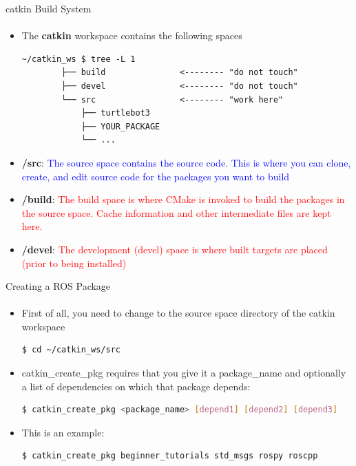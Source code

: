 \documentclass[aspectratio=169]{beamer}
\begin{document}
\begin{frame}[fragile]{catkin Build System}
	\framesubtitle{ }
    \begin{itemize}
        \item The \textbf{catkin} workspace contains the following spaces

		\begin{lstlisting}[style=ascii-tree]
		~/catkin_ws $ tree -L 1
		├── build				<-------- "do not touch"
		├── devel				<-------- "do not touch"
		└── src					<-------- "work here"
			├── turtlebot3
			├── YOUR_PACKAGE
			└── ...
		\end{lstlisting}

		\item \textbf{/src}: \textcolor{blue}{The source space contains the source code. This is where you can clone, create, and edit source code for the packages you want to build}
		\item \textbf{/build}: \textcolor{red}{The build space is where CMake is invoked to build the packages in the source space. Cache information and other intermediate files are kept here.}
		\item \textbf{/devel}: \textcolor{red}{The development (devel) space is where built targets are placed (prior to being installed)}
		\end{itemize}
\end{frame}


\begin{frame}[fragile]{Creating a ROS Package}
	\framesubtitle{ }
    \begin{itemize}
        \item First of all, you need to change to the source space directory of the catkin workspace
		\begin{lstlisting}[language=bash]
	$ cd ~/catkin_ws/src
		\end{lstlisting}
		\item catkin\_create\_pkg requires that you give it a package\_name and optionally a list of dependencies on which that package depends:
		\begin{lstlisting}[language=bash]
	$ catkin_create_pkg <package_name> [depend1] [depend2] [depend3]
		\end{lstlisting}
		\item This is an example:
		\begin{lstlisting}[language=bash]
			$ catkin_create_pkg beginner_tutorials std_msgs rospy roscpp
		\end{lstlisting}
	\end{itemize}
\end{frame}
\end{document}

